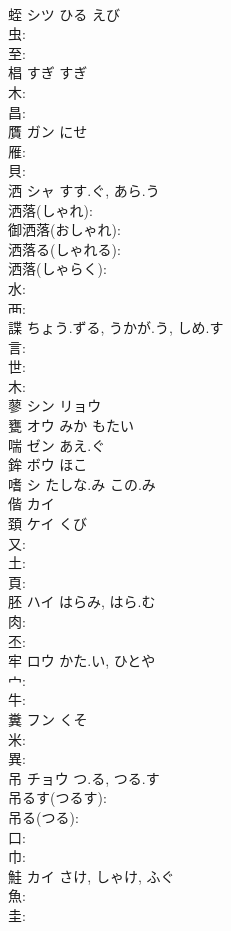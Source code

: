 \documentclass[8pt]{extreport}
\begin{document}
\begin{CJK}{UTF8}{min}
\\	蛭	シツ	ひる	えび	
\\	虫: 
\\	至: 
\\	椙	すぎ	すぎ		
\\	木: 
\\	昌: 
\\	贋	ガン	にせ		
\\	雁: 
\\	貝: 
\\	洒	シャ	すす.ぐ, あら.う		
\\	洒落(しゃれ): 
\\	御洒落(おしゃれ): 
\\	洒落る(しゃれる): 
\\	洒落(しゃらく): 
\\	水: 
\\	襾: 
\\	諜		ちょう.ずる, うかが.う, しめ.す			
\\	言: 
\\	世: 
\\	木: 
\\	蓼	シン リョウ			
\\	甕	オウ みか もたい			
\\	喘	ゼン あえ.ぐ			
\\	鉾	ボウ ほこ			
\\	嗜	シ たしな.み この.み			
\\	偕	カイ			
\\	頚	ケイ	くび		
\\	又: 
\\	土: 
\\	頁: 
\\	胚	ハイ	はらみ, はら.む		
\\	肉: 
\\	丕: 
\\	牢	ロウ	かた.い, ひとや		
\\	宀: 
\\	牛: 
\\	糞	フン	くそ		
\\	米: 
\\	異: 
\\	吊	チョウ	つ.る, つる.す		
\\	吊るす(つるす): 
\\	吊る(つる): 
\\	口: 
\\	巾: 
\\	鮭	カイ	さけ, しゃけ, ふぐ		
\\	魚: 
\\	圭: 

\end{CJK}
\end{document}
